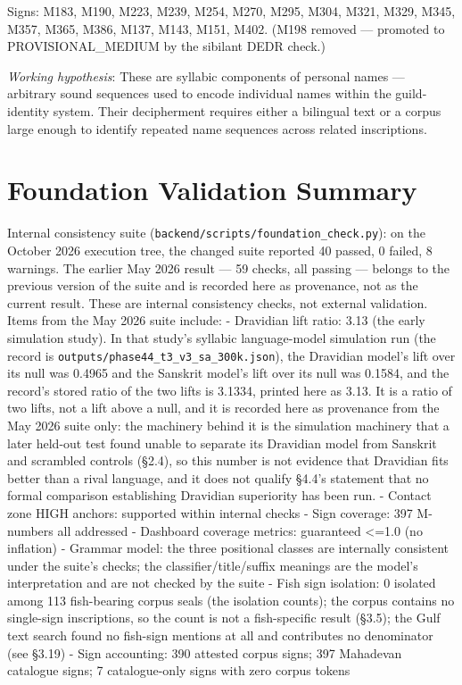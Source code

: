 \documentclass[11pt]{article}
\begin{document}
Signs: M183, M190, M223, M239, M254, M270, M295, M304, M321, M329,
M345, M357, M365, M386, M137, M143, M151, M402. (M198 removed --- promoted to PROVISIONAL\_MEDIUM by the sibilant DEDR check.)

\emph{Working hypothesis}: These are syllabic components of personal
names --- arbitrary sound sequences used to encode individual names
within the guild-identity system. Their decipherment requires either a
bilingual text or a corpus large enough to identify repeated name
sequences across related inscriptions.

\section{Foundation Validation
Summary}\label{appendix-c-foundation-validation-summary}

Internal consistency suite (\texttt{backend/scripts/foundation\_check.py}): on the October 2026 execution tree, the changed suite reported 40 passed, 0 failed, 8 warnings. The earlier May 2026 result --- 59 checks, all passing --- belongs to the previous version of the suite and is recorded here as provenance, not as the current result. These are internal consistency checks, not external validation. Items from the May 2026 suite include: -
Dravidian lift ratio: 3.13 (the early simulation study). In that study's syllabic language-model simulation run (the record is \texttt{outputs/phase44\_t3\_v3\_sa\_300k.json}), the Dravidian model's lift over its null was 0.4965 and the Sanskrit model's lift over its null was 0.1584, and the record's stored ratio of the two lifts is 3.1334, printed here as 3.13. It is a ratio of two lifts, not a lift above a null, and it is recorded here as provenance from the May 2026 suite only: the machinery behind it is the simulation machinery that a later held-out test found unable to separate its Dravidian model from Sanskrit and scrambled controls (§2.4), so this number is not evidence that Dravidian fits better than a rival language, and it does not qualify §4.4's statement that no formal comparison establishing Dravidian superiority has been run. - Contact zone
HIGH anchors: supported within internal checks - Sign coverage: 397 M-numbers all
addressed - Dashboard coverage metrics: guaranteed \textless{}=1.0 (no inflation) -
Grammar model: the three positional classes are internally consistent under the suite's checks; the classifier/title/suffix meanings are the model's interpretation and are not checked by the suite - Fish sign isolation: 0 isolated among 113 fish-bearing corpus seals (the isolation counts); the corpus contains no single-sign inscriptions, so the count is not a fish-specific result (§3.5); the Gulf text search found no fish-sign mentions at all and contributes no denominator (see §3.19)
- Sign accounting: 390 attested corpus signs; 397 Mahadevan catalogue signs; 7 catalogue-only signs with zero corpus tokens
\end{document}
